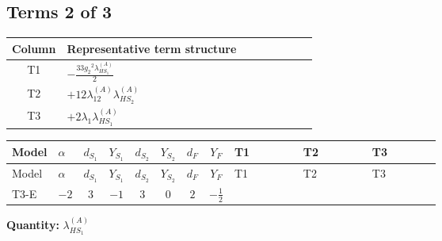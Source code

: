 \documentclass[8pt]{article}
\begin{document}
\begin{landscape}
\subsection*{Terms 2 of 3}
\begin{center}
\begin{tabular}{@{}c >{\raggedright\arraybackslash}p{0.82\linewidth}@{}}
\toprule
Column & Representative term structure \\
\midrule
T1 & \(\displaystyle -\frac{33 {g_2}^2 {\lambda_{HS_1}^{(A)}}}{2}\) \\
\midrule
T2 & \(\displaystyle +12 {\lambda_{12}^{(A)}} {\lambda_{HS_2}^{(A)}}\) \\
\midrule
T3 & \(\displaystyle +2 {\lambda_1} {\lambda_{HS_1}^{(A)}}\) \\
\midrule
\bottomrule
\end{tabular}
\end{center}
\smallskip
\tiny
\begin{longtable}{@{}llcccccc >{\raggedright\arraybackslash}p{0.21\linewidth} >{\raggedright\arraybackslash}p{0.21\linewidth} >{\raggedright\arraybackslash}p{0.21\linewidth}@{}}
\toprule
Model & $\alpha$ & $d_{S_1}$ & $Y_{S_1}$ & $d_{S_2}$ & $Y_{S_2}$ & $d_F$ & $Y_F$ & T1 & T2 & T3 \\
\midrule
\endfirsthead
\toprule
Model & $\alpha$ & $d_{S_1}$ & $Y_{S_1}$ & $d_{S_2}$ & $Y_{S_2}$ & $d_F$ & $Y_F$ & T1 & T2 & T3 \\
\midrule
\endhead
T3-E & $-2$ & $3$ & $-1$ & $3$ & $0$ & $2$ & $-\frac{1}{2}$ & \scriptsize\adjustbox{max width=\linewidth}{$\begin{gathered} -\frac{33 {g_2}^2 {\lambda_{HS_1}^{(A)}}}{2}\end{gathered}$} & \scriptsize\adjustbox{max width=\linewidth}{$\begin{gathered} +12 {\lambda_{12}^{(A)}} {\lambda_{HS_2}^{(A)}}\end{gathered}$} & \scriptsize\adjustbox{max width=\linewidth}{$\begin{gathered} +2 {\lambda_1} {\lambda_{HS_1}^{(A)}}\end{gathered}$} \\
\midrule
\bottomrule
\end{longtable}
\clearpage
\noindent\textbf{Quantity: }$\lambda_{HS_1}^{(A)}$\par\smallskip

\end{landscape}
\end{document}
